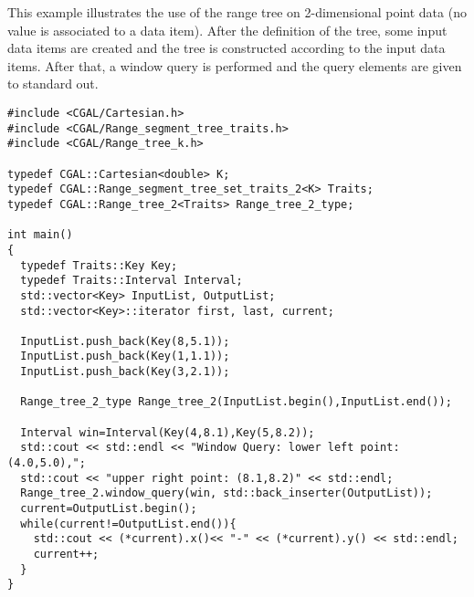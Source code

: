 This example illustrates the use of the range tree on
2-dimensional point data (no value is associated to a data item).
After the definition of the tree, some input data items are
created and the tree is constructed according to the input data
items.
After that, a window query is performed and the query elements
are given to standard out.

\begin{verbatim}
#include <CGAL/Cartesian.h>
#include <CGAL/Range_segment_tree_traits.h>
#include <CGAL/Range_tree_k.h>

typedef CGAL::Cartesian<double> K;
typedef CGAL::Range_segment_tree_set_traits_2<K> Traits;
typedef CGAL::Range_tree_2<Traits> Range_tree_2_type;

int main()
{
  typedef Traits::Key Key;
  typedef Traits::Interval Interval;
  std::vector<Key> InputList, OutputList;
  std::vector<Key>::iterator first, last, current;

  InputList.push_back(Key(8,5.1));
  InputList.push_back(Key(1,1.1));
  InputList.push_back(Key(3,2.1));

  Range_tree_2_type Range_tree_2(InputList.begin(),InputList.end());

  Interval win=Interval(Key(4,8.1),Key(5,8.2));
  std::cout << std::endl << "Window Query: lower left point: (4.0,5.0),";
  std::cout << "upper right point: (8.1,8.2)" << std::endl;
  Range_tree_2.window_query(win, std::back_inserter(OutputList));
  current=OutputList.begin();
  while(current!=OutputList.end()){
    std::cout << (*current).x()<< "-" << (*current).y() << std::endl;
    current++;
  }
}
\end{verbatim}

